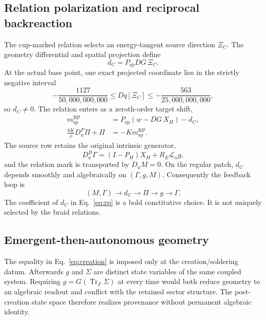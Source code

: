 \documentclass[11pt]{article}
\theoremstyle{definition}
\theoremstyle{remark}
\newcommand{\Tr}{\operatorname{Tr}}
\newcommand{\Lie}{\mathcal{L}}
\begin{document}
\subsection{Relation polarization and reciprocal backreaction}

The cup-marked relation selects an energy-tangent source direction $\Xi_C$. The geometry differential and spatial projection define
\begin{equation}\label{eq:dc}
  d_C=P_{\mathrm{sp}}DG\,\Xi_C.
\end{equation}
At the actual base point, one exact projected coordinate lies in the strictly negative interval
\begin{equation}
  -\frac{1127}{50{,}000{,}000{,}000}
  \le Dq[\Xi_C]\le
  -\frac{563}{25{,}000{,}000{,}000},
\end{equation}
so $d_C\ne0$. The relation enters as a zeroth-order target shift,
\begin{align}
  m_{\mathrm{sp}}^{\mathrm{RP}}
  &=P_{\mathrm{sp}}(w-DG\,X_H)-d_C,\\
  \frac{8K}{\rho}D_u^P\Pi+\Pi
  &=-K m_{\mathrm{sp}}^{\mathrm{RP}}.\label{eq:rp}
\end{align}
The source row retains the original intrinsic generator,
\begin{equation}
  D_u^B\Gamma=(I-P_H)X_H+R_E\Lie_u g,
\end{equation}
and the relation mark is transported by $D_uM=0$. On the regular patch, $d_C$ depends smoothly and algebraically on $(\Gamma,g,M)$. Consequently the feedback loop is
\begin{equation}\label{eq:loop}
  (M,\Gamma)\longrightarrow d_C\longrightarrow\Pi
  \longrightarrow g\longrightarrow\Gamma.
\end{equation}
The coefficient of $d_C$ in Eq.~\eqref{eq:rp} is a bold constitutive choice. It is not uniquely selected by the braid relations.

\subsection{Emergent-then-autonomous geometry}

The equality in Eq.~\eqref{eq:creation} is imposed only at the creation/soldering datum. Afterwards $g$ and $\Sigma$ are distinct state variables of the same coupled system. Requiring $g=G(\Tr_F\Sigma)$ at every time would both reduce geometry to an algebraic readout and conflict with the retained sector structure. The post-creation state space therefore realizes provenance without permanent algebraic identity.
\end{document}
